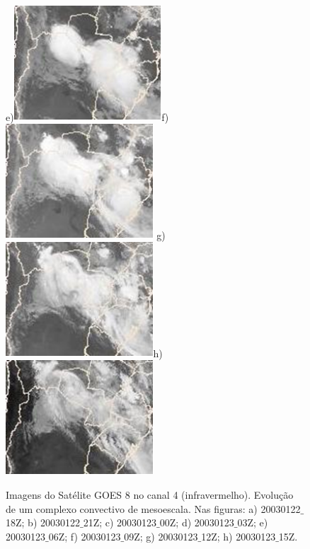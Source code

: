 \begin{figure}
\\[0.15cm]
e)\includegraphics[height=4.3cm]{./figs/sat05.png}\hspace{0.2cm}f)\includegraphics[height=4.3cm]{./figs/sat06.png}\hspace{0.2cm}
g)\includegraphics[height=4.3cm]{./figs/sat07.png}\hspace{0.2cm}h)\includegraphics[height=4.3cm]{./figs/sat08.png}
\caption{Imagens do Satélite GOES 8 no canal 4 (infravermelho). Evolução de um complexo convectivo de mesoescala. Nas figuras: a) 20030122$\_$18Z; b) 20030122$\_$21Z; c) 20030123$\_$00Z; d) 20030123$\_$03Z; e) 20030123$\_$06Z; f) 20030123$\_$09Z; g) 20030123$\_$12Z; h) 20030123$\_$15Z.}
\label{fig61}
\end{figure}

